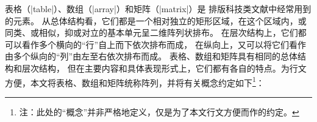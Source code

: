 \documentclass[dvipsnames]{article}%
\begin{document}
表格（|table|）、数组（|array|）和矩阵（|matrix|）是
排版科技类文献中经常用到的元素。
从总体结构看，它们都是一个相对独立的矩形区域，在这个区域内，或同类、或相似，抑或对立的基本单元呈二维阵列状排布。
在层次结构上，它们都可以看作多个横向的“行”自上而下依次排布而成，
在纵向上，又可以将它们看作由多个纵向的“列”由左至右依次排布而成。
表格、数组和矩阵具有相同的总体结构和层次结构，
但在主要内容和具体表现形式上，它们都有各自的特点。为行文方便，本文将表格、数组和矩阵统称阵列，并将有关概念约定如下\footnote{注：此处的“概念”并非严格地定义，仅是为了本文行文方便而作的约定。}：

\end{document}

